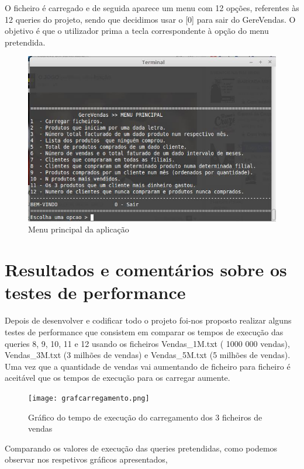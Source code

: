 O ficheiro é carregado e de seguida aparece um menu com 12 opções, referentes às 12 queries do projeto, sendo que decidimos usar o [0] para sair do GereVendas. O objetivo é que o utilizador prima a tecla correspondente à opção do menu pretendida.

\begin{figure}[h!]
	\centering
	\includegraphics[scale=0.6]{menu.png}  
	\caption{Menu principal da aplicação}  
\end{figure}



\chapter{Resultados e comentários sobre os testes de performance}
Depois de desenvolver e codificar todo o projeto foi-nos proposto realizar alguns testes de performance que consistem em comparar os tempos de execução das queries 8, 9, 10, 11 e 12 usando os ficheiros Vendas\_1M.txt ( 1000 000 vendas), Vendas\_3M.txt (3 milhões de vendas) e Vendas\_5M.txt (5 milhões de vendas).
Uma vez que a quantidade de vendas vai aumentando de ficheiro para ficheiro é aceitável que os tempos de execução para os carregar aumente.


\begin{figure}[h!]
	\centering
	\texttt{[image: grafcarregamento.png]}  
	\caption{Gráfico do tempo de execução do carregamento dos 3 ficheiros de vendas}  
\end{figure}

Comparando os valores de execução das queries pretendidas, como podemos observar nos respetivos gráficos apresentados,




